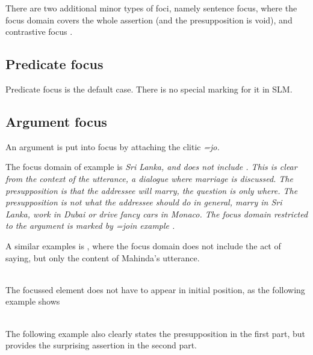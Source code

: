 There are two additional minor types of foci, namely sentence focus, where the focus domain covers the whole assertion (and the presupposition is void), and contrastive focus \kuckn.

\subsection{Predicate focus}\label{sec:disc:Predicatefocus}
Predicate focus is the default case. There is no special marking for it in SLM.

\subsection{Argument focus}\label{sec:disc:Argumentfocus}
An argument is put into focus by attaching the clitic \em=jo\em{}.


The focus domain of example  is \em Sri Lanka\em, and does not include . This is clear from the context of the utterance, a dialogue where marriage is discussed. The presupposition is that the addressee will marry, the question is only where. The presupposition is not what the addressee should do in general, marry in Sri Lanka, work in Dubai or drive fancy cars in Monaco.
The focus domain restricted to the argument is marked by \em =jo\em in example .

A similar examples is , where the focus domain does not include the act of saying, but only the content of Mahinda's utterance.

\\ 


The focussed element does not have to appear in initial position, as the following example shows

 \\
The following example also clearly states the presupposition in the first part, but provides the surprising assertion in the second part.

